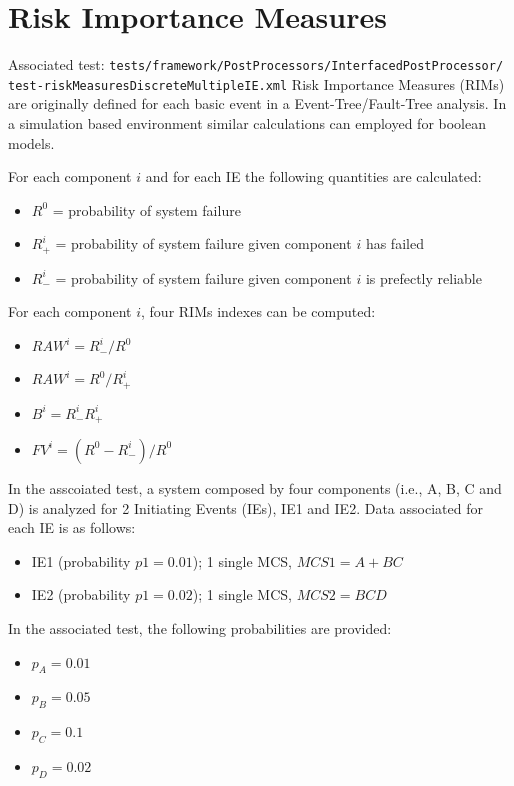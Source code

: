 \section{Risk Importance Measures}
Associated test: \texttt{tests/framework/PostProcessors/InterfacedPostProcessor/\\test-riskMeasuresDiscreteMultipleIE.xml}
Risk Importance Measures (RIMs) are originally defined for each basic event in a Event-Tree/Fault-Tree analysis.
In a simulation based environment similar calculations can employed for boolean models.

For each component $i$ and for each IE the following quantities are calculated:
\begin{itemize}
  \item $R^0$ = probability of system failure
  \item $R^i_+$ = probability of system failure given component $i$ has failed
  \item $R^i_-$ = probability of system failure given component $i$ is prefectly reliable
\end{itemize}

For each component $i$, four RIMs indexes can be computed:
\begin{itemize}
  \item $RAW^i = R^i_-/R^0$
  \item $RAW^i = R^0/R^i_+$
  \item $B^i = R^i_- R^i_+$
  \item $FV^i = (R^0 -  R^i_-)/R^0$
\end{itemize}

In the asscoiated test, a system composed by four components (i.e., A, B, C and D) is analyzed for 2 Initiating Events (IEs), IE1 and IE2.
Data associated for each IE is as follows:
\begin{itemize}
  \item IE1 (probability $p1=0.01$); 1 single MCS, $MCS1 = A+BC$
  \item IE2 (probability $p1=0.02$); 1 single MCS, $MCS2 = BCD$
\end{itemize}

In the associated test, the following probabilities are provided:
\begin{itemize}
  \item $p_A = 0.01$
  \item $p_B = 0.05$
  \item $p_C = 0.1 $
  \item $p_D = 0.02$
\end{itemize}

